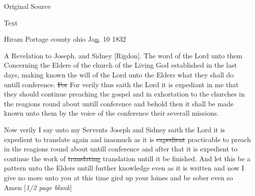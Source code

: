 			
			\begin{description}
				\item[Original Source]
			\end{description}
			
			
			\begin{description}
				\item[Text]
			\end{description}
			
				\begin{tightcenter}
				Hiram Portage county ohio Ja\uline{n}. 10 1832
				\end{tightcenter}
				
				A Revelation to Joseph. and Sidney [Rigdon]. The word of the Lord unto them Concerning the Elders of the church of the Living God established in the last days, making known the will of the Lord unto the Elders what they shall do untill conference. \sout{For} For verily thus saith the Lord it is expediant in me that they should continue preaching the gospel and in exhortation to the churches in the reagions round about untill conference and behold then it shall be made known unto them by the voice of the conference their severall missions.
				
				Now verily I say unto my Servents Joseph and Sidney saith the Lord it is expedient to translate again and inasmuch as it is \sout{expedient} practicable to preach in the reagions round about untill conference and after that it is expedient to continue the work of \sout{translating} translation untill it be finished. And let this be a pattern unto the Elders untill further knowledge even as it is written and now I give no more unto you at this time gird up your loines and be sober even so Amen [\textit{1/2 page blank}]
				

